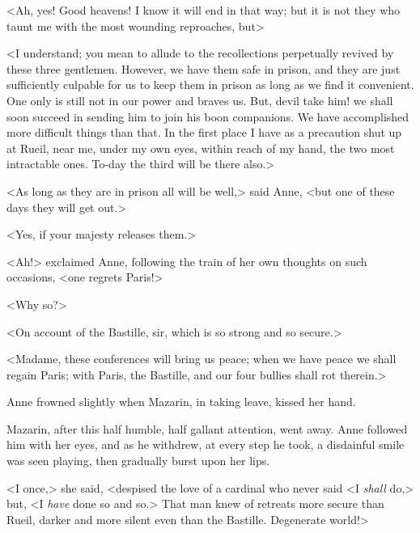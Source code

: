 <Ah, yes! Good heavens! I know it will end in that way; but it is not they who taunt me with the most wounding reproaches, but\longdash>

<I understand; you mean to allude to the recollections perpetually revived by these three gentlemen. However, we have them safe in prison, and they are just sufficiently culpable for us to keep them in prison as long as we find it convenient. One only is still not in our power and braves us. But, devil take him! we shall soon succeed in sending him to join his boon companions. We have accomplished more difficult things than that. In the first place I have as a precaution shut up at Rueil, near me, under my own eyes, within reach of my hand, the two most intractable ones. To-day the third will be there also.>

<As long as they are in prison all will be well,> said Anne, <but one of these days they will get out.>

<Yes, if your majesty releases them.>

<Ah!> exclaimed Anne, following the train of her own thoughts on such occasions, <one regrets Paris!>

<Why so?>

<On account of the Bastille, sir, which is so strong and so secure.>

<Madame, these conferences will bring us peace; when we have peace we shall regain Paris; with Paris, the Bastille, and our four bullies shall rot therein.>

Anne frowned slightly when Mazarin, in taking leave, kissed her hand.

Mazarin, after this half humble, half gallant attention, went away. Anne followed him with her eyes, and as he withdrew, at every step he took, a disdainful smile was seen playing, then gradually burst upon her lips.

<I once,> she said, <despised the love of a cardinal who never said <I \emph{shall} do,> but, <I \emph{have} done so and so.> That man knew of retreats more secure than Rueil, darker and more silent even than the Bastille. Degenerate world!> 